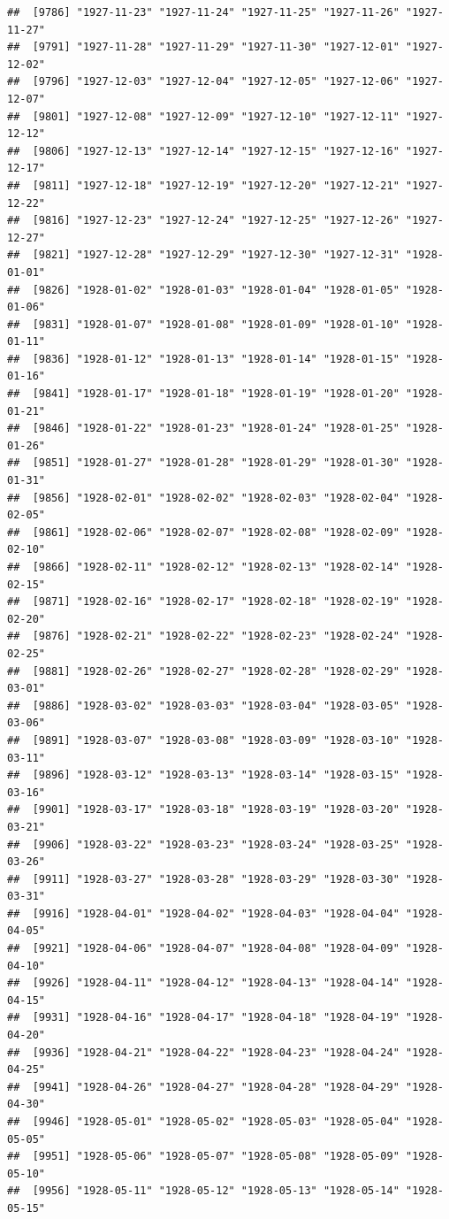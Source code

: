 \documentclass{article}\usepackage[]{graphicx}\usepackage[]{color}
\makeatletter
\newenvironment{kframe}{%
 \def\at@end@of@kframe{}%
 \ifinner\ifhmode%
  \def\at@end@of@kframe{\end{minipage}}%
  \begin{minipage}{\columnwidth}%
 \fi\fi%
 \def\FrameCommand##1{\hskip\@totalleftmargin \hskip-\fboxsep
 \colorbox{shadecolor}{##1}\hskip-\fboxsep
     \hskip-\linewidth \hskip-\@totalleftmargin \hskip\columnwidth}%
 \MakeFramed {\advance\hsize-\width
   \@totalleftmargin\z@ \linewidth\hsize
   \@setminipage}}%
 {\par\unskip\endMakeFramed%
 \at@end@of@kframe}
\newenvironment{knitrout}{}{} %
\makeatother
\begin{document}
\begin{description}
\begin{knitrout}
\begin{kframe}
\begin{verbatim}
##  [9786] "1927-11-23" "1927-11-24" "1927-11-25" "1927-11-26" "1927-11-27"
##  [9791] "1927-11-28" "1927-11-29" "1927-11-30" "1927-12-01" "1927-12-02"
##  [9796] "1927-12-03" "1927-12-04" "1927-12-05" "1927-12-06" "1927-12-07"
##  [9801] "1927-12-08" "1927-12-09" "1927-12-10" "1927-12-11" "1927-12-12"
##  [9806] "1927-12-13" "1927-12-14" "1927-12-15" "1927-12-16" "1927-12-17"
##  [9811] "1927-12-18" "1927-12-19" "1927-12-20" "1927-12-21" "1927-12-22"
##  [9816] "1927-12-23" "1927-12-24" "1927-12-25" "1927-12-26" "1927-12-27"
##  [9821] "1927-12-28" "1927-12-29" "1927-12-30" "1927-12-31" "1928-01-01"
##  [9826] "1928-01-02" "1928-01-03" "1928-01-04" "1928-01-05" "1928-01-06"
##  [9831] "1928-01-07" "1928-01-08" "1928-01-09" "1928-01-10" "1928-01-11"
##  [9836] "1928-01-12" "1928-01-13" "1928-01-14" "1928-01-15" "1928-01-16"
##  [9841] "1928-01-17" "1928-01-18" "1928-01-19" "1928-01-20" "1928-01-21"
##  [9846] "1928-01-22" "1928-01-23" "1928-01-24" "1928-01-25" "1928-01-26"
##  [9851] "1928-01-27" "1928-01-28" "1928-01-29" "1928-01-30" "1928-01-31"
##  [9856] "1928-02-01" "1928-02-02" "1928-02-03" "1928-02-04" "1928-02-05"
##  [9861] "1928-02-06" "1928-02-07" "1928-02-08" "1928-02-09" "1928-02-10"
##  [9866] "1928-02-11" "1928-02-12" "1928-02-13" "1928-02-14" "1928-02-15"
##  [9871] "1928-02-16" "1928-02-17" "1928-02-18" "1928-02-19" "1928-02-20"
##  [9876] "1928-02-21" "1928-02-22" "1928-02-23" "1928-02-24" "1928-02-25"
##  [9881] "1928-02-26" "1928-02-27" "1928-02-28" "1928-02-29" "1928-03-01"
##  [9886] "1928-03-02" "1928-03-03" "1928-03-04" "1928-03-05" "1928-03-06"
##  [9891] "1928-03-07" "1928-03-08" "1928-03-09" "1928-03-10" "1928-03-11"
##  [9896] "1928-03-12" "1928-03-13" "1928-03-14" "1928-03-15" "1928-03-16"
##  [9901] "1928-03-17" "1928-03-18" "1928-03-19" "1928-03-20" "1928-03-21"
##  [9906] "1928-03-22" "1928-03-23" "1928-03-24" "1928-03-25" "1928-03-26"
##  [9911] "1928-03-27" "1928-03-28" "1928-03-29" "1928-03-30" "1928-03-31"
##  [9916] "1928-04-01" "1928-04-02" "1928-04-03" "1928-04-04" "1928-04-05"
##  [9921] "1928-04-06" "1928-04-07" "1928-04-08" "1928-04-09" "1928-04-10"
##  [9926] "1928-04-11" "1928-04-12" "1928-04-13" "1928-04-14" "1928-04-15"
##  [9931] "1928-04-16" "1928-04-17" "1928-04-18" "1928-04-19" "1928-04-20"
##  [9936] "1928-04-21" "1928-04-22" "1928-04-23" "1928-04-24" "1928-04-25"
##  [9941] "1928-04-26" "1928-04-27" "1928-04-28" "1928-04-29" "1928-04-30"
##  [9946] "1928-05-01" "1928-05-02" "1928-05-03" "1928-05-04" "1928-05-05"
##  [9951] "1928-05-06" "1928-05-07" "1928-05-08" "1928-05-09" "1928-05-10"
##  [9956] "1928-05-11" "1928-05-12" "1928-05-13" "1928-05-14" "1928-05-15"

\end{verbatim}
\end{kframe}
\end{knitrout}
\end{description}
\end{document}

